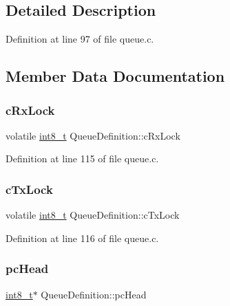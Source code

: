 \subsection{Detailed Description}


Definition at line 97 of file queue.\+c.



\subsection{Member Data Documentation}
\mbox{\label{structQueueDefinition_ac750a3f75a6e174adbc697e473a0dd13}} 
\subsubsection{\texorpdfstring{c\+Rx\+Lock}{cRxLock}}
{\footnotesize\ttfamily volatile \hyperlink{stdint_8h_aef44329758059c91c76d334e8fc09700}{int8\+\_\+t} Queue\+Definition\+::c\+Rx\+Lock}



Definition at line 115 of file queue.\+c.

\mbox{\label{structQueueDefinition_a24ac3f0707f098da2a22244d843fcf82}} 
\subsubsection{\texorpdfstring{c\+Tx\+Lock}{cTxLock}}
{\footnotesize\ttfamily volatile \hyperlink{stdint_8h_aef44329758059c91c76d334e8fc09700}{int8\+\_\+t} Queue\+Definition\+::c\+Tx\+Lock}



Definition at line 116 of file queue.\+c.

\mbox{\label{structQueueDefinition_a487dc7e43b380c58212cba72bc33e0ed}} 
\subsubsection{\texorpdfstring{pc\+Head}{pcHead}}
{\footnotesize\ttfamily \hyperlink{stdint_8h_aef44329758059c91c76d334e8fc09700}{int8\+\_\+t}$\ast$ Queue\+Definition\+::pc\+Head}



